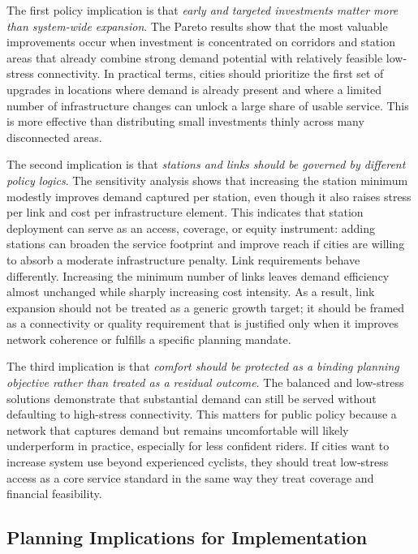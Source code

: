 \documentclass[preprint,authoryear,10pt]{elsarticle}
\begin{document}
The first policy implication is that \textit{early and targeted investments matter more than system-wide expansion}. The Pareto results show that the most valuable improvements occur when investment is concentrated on corridors and station areas that already combine strong demand potential with relatively feasible low-stress connectivity. In practical terms, cities should prioritize the first set of upgrades in locations where demand is already present and where a limited number of infrastructure changes can unlock a large share of usable service. This is more effective than distributing small investments thinly across many disconnected areas.

The second implication is that \textit{stations and links should be governed by different policy logics}. The sensitivity analysis shows that increasing the station minimum modestly improves demand captured per station, even though it also raises stress per link and cost per infrastructure element. This indicates that station deployment can serve as an access, coverage, or equity instrument: adding stations can broaden the service footprint and improve reach if cities are willing to absorb a moderate infrastructure penalty. Link requirements behave differently. Increasing the minimum number of links leaves demand efficiency almost unchanged while sharply increasing cost intensity. As a result, link expansion should not be treated as a generic growth target; it should be framed as a connectivity or quality requirement that is justified only when it improves network coherence or fulfills a specific planning mandate.

The third implication is that \textit{comfort should be protected as a binding planning objective rather than treated as a residual outcome}. The balanced and low-stress solutions demonstrate that substantial demand can still be served without defaulting to high-stress connectivity. This matters for public policy because a network that captures demand but remains uncomfortable will likely underperform in practice, especially for less confident riders. If cities want to increase system use beyond experienced cyclists, they should treat low-stress access as a core service standard in the same way they treat coverage and financial feasibility.

\subsection{Planning Implications for Implementation}
\end{document}
